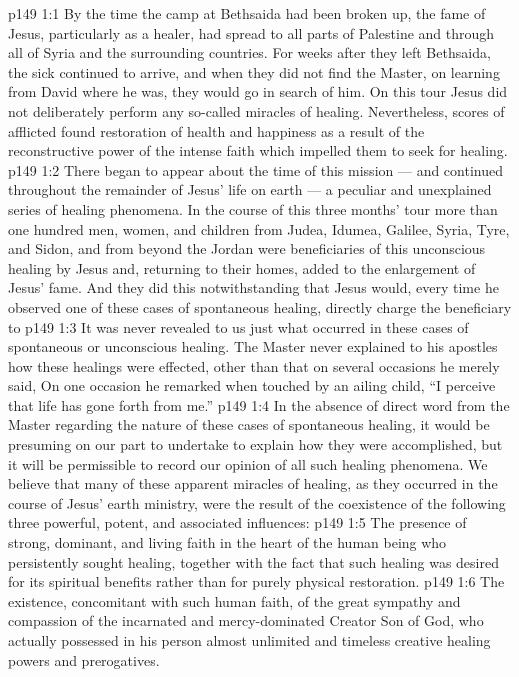 \vs p149 1:1 By the time the camp at Bethsaida had been broken up, the fame of Jesus, particularly as a healer, had spread to all parts of Palestine and through all of Syria and the surrounding countries. For weeks after they left Bethsaida, the sick continued to arrive, and when they did not find the Master, on learning from David where he was, they would go in search of him. On this tour Jesus did not deliberately perform any so\hyp{}called miracles of healing. Nevertheless, scores of afflicted found restoration of health and happiness as a result of the reconstructive power of the intense faith which impelled them to seek for healing.
\vs p149 1:2 There began to appear about the time of this mission --- and continued throughout the remainder of Jesus’ life on earth --- a peculiar and unexplained series of healing phenomena. In the course of this three months’ tour more than one hundred men, women, and children from Judea, Idumea, Galilee, Syria, Tyre, and Sidon, and from beyond the Jordan were beneficiaries of this unconscious healing by Jesus and, returning to their homes, added to the enlargement of Jesus’ fame. And they did this notwithstanding that Jesus would, every time he observed one of these cases of spontaneous healing, directly charge the beneficiary to 
\vs p149 1:3 \pc It was never revealed to us just what occurred in these cases of spontaneous or unconscious healing. The Master never explained to his apostles how these healings were effected, other than that on several occasions he merely said,  On one occasion he remarked when touched by an ailing child, “I perceive that life has gone forth from me.”
\vs p149 1:4 In the absence of direct word from the Master regarding the nature of these cases of spontaneous healing, it would be presuming on our part to undertake to explain how they were accomplished, but it will be permissible to record our opinion of all such healing phenomena. We believe that many of these apparent miracles of healing, as they occurred in the course of Jesus’ earth ministry, were the result of the coexistence of the following three powerful, potent, and associated influences:
\vs p149 1:5 \bibnobreakspace The presence of strong, dominant, and living faith in the heart of the human being who persistently sought healing, together with the fact that such healing was desired for its spiritual benefits rather than for purely physical restoration.
\vs p149 1:6 \bibnobreakspace The existence, concomitant with such human faith, of the great sympathy and compassion of the incarnated and mercy\hyp{}dominated Creator Son of God, who actually possessed in his person almost unlimited and timeless creative healing powers and prerogatives.
